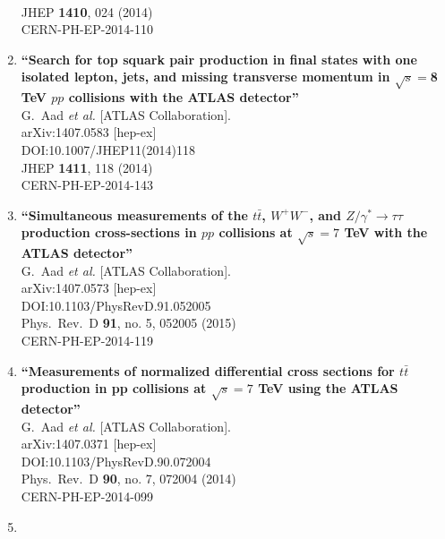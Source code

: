 \documentclass{article}
\begin{document}
\begin{enumerate}
  \\{}JHEP {\bf 1410}, 024 (2014)
  \\{}CERN-PH-EP-2014-110
\item%
{\bf ``Search for top squark pair production in final states with one isolated lepton, jets, and missing transverse momentum in $\sqrt s =$8 TeV $pp$ collisions with the ATLAS detector''}
  \\{}G.~Aad {\it et al.} [ATLAS Collaboration].
  \\{}arXiv:1407.0583 [hep-ex]
  \\{}DOI:10.1007/JHEP11(2014)118
  \\{}JHEP {\bf 1411}, 118 (2014)
  \\{}CERN-PH-EP-2014-143
\item%
{\bf ``Simultaneous measurements of the $t\bar{t}$, $W^+W^-$, and $Z/\gamma^{*}\rightarrow\tau\tau$ production cross-sections in $pp$ collisions at $\sqrt{s} = 7$ TeV with the ATLAS detector''}
  \\{}G.~Aad {\it et al.} [ATLAS Collaboration].
  \\{}arXiv:1407.0573 [hep-ex]
  \\{}DOI:10.1103/PhysRevD.91.052005
  \\{}Phys.\ Rev.\ D {\bf 91}, no. 5, 052005 (2015)
  \\{}CERN-PH-EP-2014-119
\item%
{\bf ``Measurements of normalized differential cross sections for $t\bar{t}$ production in pp collisions at $\sqrt{s}=7$  TeV using the ATLAS detector''}
  \\{}G.~Aad {\it et al.} [ATLAS Collaboration].
  \\{}arXiv:1407.0371 [hep-ex]
  \\{}DOI:10.1103/PhysRevD.90.072004
  \\{}Phys.\ Rev.\ D {\bf 90}, no. 7, 072004 (2014)
  \\{}CERN-PH-EP-2014-099
\item%

\end{enumerate}
\end{document}
